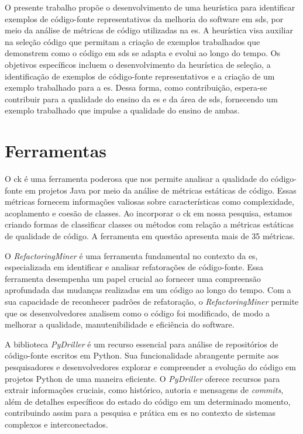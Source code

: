 O presente trabalho propõe o desenvolvimento de uma heurística para identificar exemplos de código-fonte representativos da melhoria do software em \gls{sds}, por meio da análise de métricas de código utilizadas na \gls{es}. A heurística visa auxiliar na seleção código que permitam a criação de exemplos trabalhados que demonstrem como o código em \gls{sds} se adapta e evolui ao longo do tempo. Os objetivos específicos incluem o desenvolvimento da heurística de seleção, a identificação de exemplos de código-fonte representativos e a criação de um exemplo trabalhado para a \gls{es}. Dessa forma, como contribuição, espera-se contribuir para a qualidade do ensino da \gls{es} e da área de \gls{sds}, fornecendo um exemplo trabalhado que impulse a qualidade do ensino de ambas.

\section{Ferramentas}\label{sec:ferramentas}
O \gls{ck} \cite{aniche-ck} é uma ferramenta poderosa que nos permite analisar a qualidade do código-fonte em projetos Java por meio da análise de métricas estáticas de código. Essas métricas fornecem informações valiosas sobre características como complexidade, acoplamento e coesão de classes. Ao incorporar o \gls{ck} em nossa pesquisa, estamos criando formas de classificar classes ou métodos com relação a métricas estáticas de qualidade de código. A ferramenta em questão apresenta mais de 35 métricas.

O \textit{RefactoringMiner} \cite{Tsantalis:ICSE:2018:RefactoringMiner} é uma ferramenta fundamental no contexto da \gls{es}, especializada em identificar e analisar refatorações de código-fonte. Essa ferramenta desempenha um papel crucial ao fornecer uma compreensão aprofundada das mudanças realizadas em um código ao longo do tempo. Com a sua capacidade de reconhecer padrões de refatoração, o \textit{RefactoringMiner} permite que os desenvolvedores analisem como o código foi modificado, de modo a melhorar a qualidade, manutenibilidade e eficiência do software.

A biblioteca \textit{PyDriller} \cite{PyDrillerSpadini2018} é um recurso essencial para análise de repositórios de código-fonte escritos em Python. Sua funcionalidade abrangente permite aos pesquisadores e desenvolvedores explorar e compreender a evolução do código em projetos Python de uma maneira eficiente. O \textit{PyDriller} oferece recursos para extrair informações cruciais, como histórico, autoria e mensagens de \textit{commits}, além de detalhes específicos do estado do código em um determinado momento, contribuindo assim para a pesquisa e prática em \gls{es} no contexto de sistemas complexos e interconectados.

